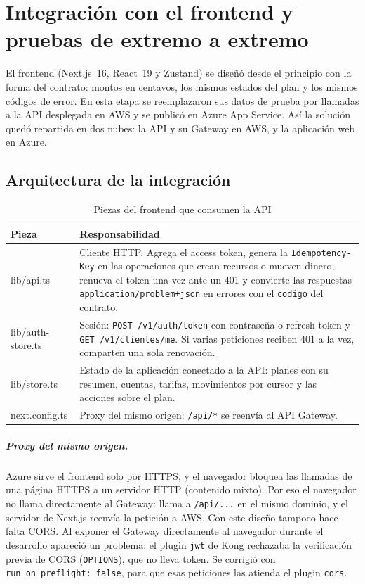\chapter{Integración con el frontend y pruebas de extremo a extremo}\label{cap:frontend}

El frontend (Next.js~16, React~19 y Zustand) se diseñó desde el principio con la forma del contrato: montos en centavos, los mismos estados del plan y los mismos códigos de error. En esta etapa se reemplazaron sus datos de prueba por llamadas a la API desplegada en AWS y se publicó en Azure App Service. Así la solución quedó repartida en dos nubes: la API y su Gateway en AWS, y la aplicación web en Azure.

\section{Arquitectura de la integración}

\begin{table}[H]
\centering
\caption{Piezas del frontend que consumen la API}\label{tab:front-piezas}
\begin{tabularx}{\linewidth}{@{}>{\ttfamily\raggedright}p{3.6cm} X@{}}
\toprule
\textbf{\normalfont Pieza} & \textbf{Responsabilidad} \\
\midrule
lib/api.ts & Cliente HTTP. Agrega el access token, genera la \texttt{Idempotency-Key} en las operaciones que crean recursos o mueven dinero, renueva el token una vez ante un 401 y convierte las respuestas \texttt{application/problem+json} en errores con el \texttt{codigo} del contrato. \\
lib/auth-store.ts & Sesión: \texttt{POST /v1/auth/token} con contraseña o refresh token y \texttt{GET /v1/clientes/me}. Si varias peticiones reciben 401 a la vez, comparten una sola renovación. \\
lib/store.ts & Estado de la aplicación conectado a la API: planes con su resumen, cuentas, tarifas, movimientos por cursor y las acciones sobre el plan. \\
next.config.ts & Proxy del mismo origen: \texttt{/api/*} se reenvía al API Gateway. \\
\bottomrule
\end{tabularx}
\end{table}

\paragraph{Proxy del mismo origen.} Azure sirve el frontend solo por HTTPS, y el navegador bloquea las llamadas de una página HTTPS a un servidor HTTP (contenido mixto). Por eso el navegador no llama directamente al Gateway: llama a \texttt{/api/...} en el mismo dominio, y el servidor de Next.js reenvía la petición a AWS. Con este diseño tampoco hace falta CORS. Al exponer el Gateway directamente al navegador durante el desarrollo apareció un problema: el plugin \texttt{jwt} de Kong rechazaba la verificación previa de CORS (\texttt{OPTIONS}), que no lleva token. Se corrigió con \texttt{run\_\allowbreak{}on\_\allowbreak{}preflight: false}, para que esas peticiones las atienda el plugin \texttt{cors}.


